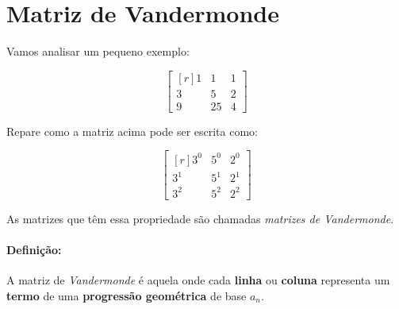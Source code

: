 \section{Matriz de Vandermonde}

Vamos analisar um pequeno exemplo:

$$
\begin{bmatrix*}[r]
1 & 1 & 1\\
3 & 5 & 2\\
9 & 25 & 4
\end{bmatrix*}
$$

Repare como a matriz acima pode ser escrita como:

$$
\begin{bmatrix*}[r]
3^0 & 5^0 & 2^0\\
3^1 & 5^1 & 2^1\\
3^2 & 5^2 & 2^2
\end{bmatrix*}
$$

As matrizes que têm essa propriedade são chamadas \textit{matrizes de Vandermonde}.

\paragraph{Definição:}
A matriz de \textit{Vandermonde} é aquela onde cada \textbf{linha} ou \textbf{coluna} representa um \textbf{termo} de uma \textbf{progressão geométrica} de base $a_n$.

\vspace{-2em}


